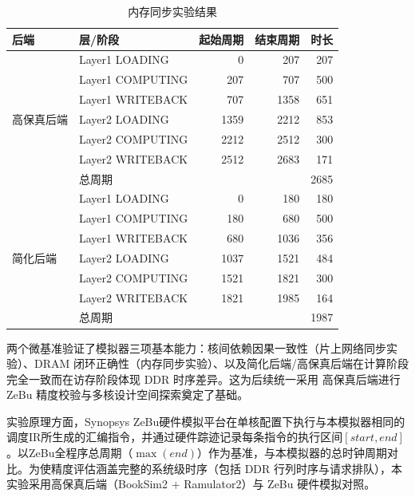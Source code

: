 \begin{table}[H]
  \centering
  \caption{内存同步实验结果}
  \label{tab:mb2}
  \small
  \begin{tabular*}{\textwidth}{@{\extracolsep{\fill}}llrrr}
    \toprule
    后端 & 层/阶段 & 起始周期 & 结束周期 & 时长 \\
    \midrule
    \multirow{7}{*}{高保真后端} & Layer1 LOADING    & 0    & 207  & 207 \\
                                    & Layer1 COMPUTING  & 207  & 707  & 500 \\
                                    & Layer1 WRITEBACK  & 707  & 1358 & 651 \\
                                    & Layer2 LOADING    & 1359 & 2212 & 853 \\
                                    & Layer2 COMPUTING  & 2212 & 2512 & 300 \\
                                    & Layer2 WRITEBACK  & 2512 & 2683 & 171 \\
    \cmidrule{2-5}
                                    & 总周期 & \multicolumn{3}{r}{2685} \\
    \midrule
    \multirow{7}{*}{简化后端} & Layer1 LOADING    & 0    & 180  & 180 \\
                             & Layer1 COMPUTING  & 180  & 680  & 500 \\
                             & Layer1 WRITEBACK  & 680  & 1036 & 356 \\
                             & Layer2 LOADING    & 1037 & 1521 & 484 \\
                             & Layer2 COMPUTING  & 1521 & 1821 & 300 \\
                             & Layer2 WRITEBACK  & 1821 & 1985 & 164 \\
    \cmidrule{2-5}
                             & 总周期 & \multicolumn{3}{r}{1987} \\
    \bottomrule
  \end{tabular*}
\end{table}

两个微基准验证了模拟器三项基本能力：核间依赖因果一致性（片上网络同步实验）、DRAM 闭环正确性（内存同步实验）、以及简化后端/高保真后端在计算阶段完全一致而在访存阶段体现 DDR 时序差异。这为后续统一采用 高保真后端进行 ZeBu 精度校验与多核设计空间探索奠定了基础。

\label{subsec:c5_zebu}

实验原理方面，Synopsys ZeBu硬件模拟平台在单核配置下执行与本模拟器相同的调度IR所生成的汇编指令，并通过硬件踪迹记录每条指令的执行区间$[\mathit{start},\mathit{end}]$。以ZeBu全程序总周期（$\max(\mathit{end})$）作为基准，与本模拟器的总时钟周期对比。为使精度评估涵盖完整的系统级时序（包括 DDR 行列时序与请求排队），本实验采用高保真后端（BookSim2 + Ramulator2）与 ZeBu 硬件模拟对照。

